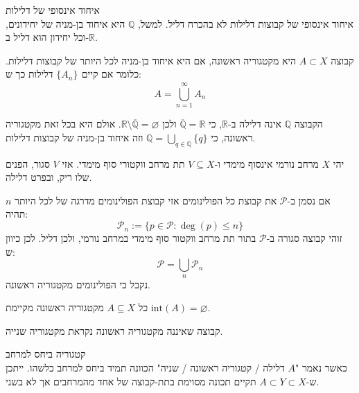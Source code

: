 \documentclass{tstextbook}
\begin{document}
\begin{remark}
איחוד אינסופי של דלילות\\

איחוד אינסופי של קבוצות דלילות לא בהכרח דליל. למשל, \(\mathbb{Q}\) היא איחוד בן-מניה של יחידונים, וכל יחידון הוא דליל ב-\(\mathbb{R}\).

\end{remark}
\begin{definition}
קבוצה \(A\subset X\) היא מקטגוריה ראשונה, אם היא איחוד בן-מניה לכל היותר של קבוצות דלילות. כלומר אם קיים \(\{ A_{n} \}_{}\) דלילות כך ש:
$$A=\bigcup_{n=1}^{\infty}A_{n}$$

\end{definition}
\begin{example}[הרציונאלים]
הקבוצה \(\mathbb{Q}\) אינה דלילה ב-\(\mathbb{R}\), כי \(\overline{\mathbb{Q}}=\mathbb{R}\) ולכן \(\mathbb{R}\setminus\overline{\mathbb{Q}}=\varnothing\). אולם היא בכל זאת מקטגוריה ראשונה, כי \(\mathbb{Q}=\bigcup_{q\in\mathbb{Q}}\{q\}\) וזה איחוד בן-מניה של קבוצות דלילות.

\end{example}
\begin{lemma}
יהי \(X\) מרחב נורמי אינסוף מימדי ו-\(V\subseteq X\) תת מרחב ווקטורי סוף מימדי. אזי \(V\) סגור, הפנים שלו ריק, ובפרט דלילה.

\end{lemma}
\begin{example}[הפולינומים]
אם נסמן ב-\(\mathcal{P}\) את קבוצת כל הפולינומים אזי קבוצת הפולינומים מדרגה של לכל היותר \(n\) תהיה:
$${\mathcal{P}}_{n}:=\{p\in{\mathcal{P}}:\deg(p)\leq n\}$$
זוהי קבוצה סגורה ב-\(\mathcal{P}\) בתור תת מרחב ווקטור סוף מימדי במרחב נורמי, ולכן דליל. לכן כיוון ש:
$$\mathcal{P}=\bigcup_{n}\mathcal{P} _{n} $$
נקבל כי הפולינומים מקטגוריה ראשונה.

\end{example}
\begin{proposition}
כל \(A\subseteq X\) מקטגוריה ראשונה מקיימת \(\text{int}(A)=\varnothing\).

\end{proposition}
\begin{definition}
קבוצה שאיננה מקטגוריה ראשונה נקראת מקטגוריה שנייה.

\end{definition}
\begin{remark}
קטגוריה ביחס למרחב\\

כאשר נאמר "\(A\) דלילה / קטגוריה ראשונה / שניה" הכוונה תמיד ביחס למרחב כלשהו. 
ייתכן ש-\(A\subset Y\subset X\) תקיים תכונה מסוימת בתת-קבוצה של אחד מהמרחבים אך לא בשני.

\end{remark}
\end{document}
